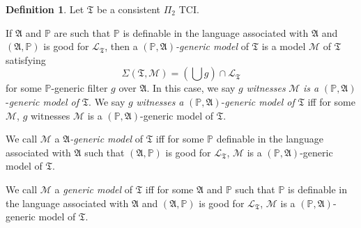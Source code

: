 \documentclass[12pt, twoside]{memoir}
\numberwithin{equation}{section}
\theoremstyle{definition}
\newtheorem{defi}[thm]{Definition}
\theoremstyle{remark}
\theoremstyle{definition}
\theoremstyle{definition}
\theoremstyle{definition}
\theoremstyle{remark}
\begin{document}
\begin{defi}\label{def4212}
Let $\mathfrak{T}$ be a consistent $\Pi_2$ TCI. 

If $\mathfrak{A}$ and $\mathbb{P}$ are such that $\mathbb{P}$ is definable in the language associated with $\mathfrak{A}$ and $(\mathfrak{A}, \mathbb{P})$ is good for $\mathcal{L}_{\mathfrak{T}}$, then a $(\mathbb{P}, \mathfrak{A})$\emph{-generic model} of $\mathfrak{T}$ is a model $\mathcal{M}$ of $\mathfrak{T}$ satisfying $$\Sigma(\mathfrak{T}, \mathcal{M}) = (\bigcup g) \cap \mathcal{L}_{\mathfrak{T}}$$ for some $\mathbb{P}$-generic filter $g$ over $\mathfrak{A}$. In this case, we say $g$ \emph{witnesses} $\mathcal{M}$ \emph{is a} $(\mathbb{P}, \mathfrak{A})$-\emph{generic model of} $\mathfrak{T}$. We say $g$ \emph{witnesses} \emph{a} $(\mathbb{P}, \mathfrak{A})$-\emph{generic model of} $\mathfrak{T}$ iff for some $\mathcal{M}$, $g$ witnesses $\mathcal{M}$ is a $(\mathbb{P}, \mathfrak{A})$-generic model of $\mathfrak{T}$.

We call $\mathcal{M}$ a $\mathfrak{A}$\emph{-generic model} of $\mathfrak{T}$ iff for some $\mathbb{P}$ definable in the language associated with $\mathfrak{A}$ such that $(\mathfrak{A}, \mathbb{P})$ is good for $\mathcal{L}_{\mathfrak{T}}$, $\mathcal{M}$ is a $(\mathbb{P}, \mathfrak{A})$-generic model of $\mathfrak{T}$.

We call $\mathcal{M}$ a \emph{generic model} of $\mathfrak{T}$ iff for some $\mathfrak{A}$ and $\mathbb{P}$ such that $\mathbb{P}$ is definable in the language associated with $\mathfrak{A}$ and $(\mathfrak{A}, \mathbb{P})$ is good for $\mathcal{L}_{\mathfrak{T}}$, $\mathcal{M}$ is a $(\mathbb{P}, \mathfrak{A})$-generic model of $\mathfrak{T}$.   
\end{defi}
\end{document}
